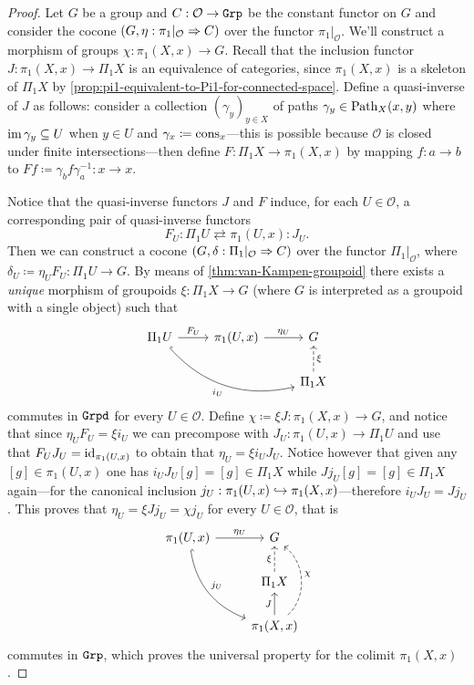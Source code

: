 \begin{proof}
    Let \(G\) be a group and \(C: \mathcal{O} \to {\texttt{Grp}}\) be the constant functor on
    \(G\) and consider the cocone \((G, \eta: \pi_1|_{\mathcal{O}} \Rightarrow C)\) over
    the functor \(\pi_1|_{\mathcal{O}}\). We'll construct a morphism of groups
    \(\chi: \pi_1(X, x) \to G\). Recall that the inclusion functor
    \(J: \pi_1(X, x) \to \Pi_1 X\) is an equivalence of categories, since
    \(\pi_1(X, x)\) is a skeleton of \(\Pi_1 X\) by
    \cref{prop:pi1-equivalent-to-Pi1-for-connected-space}. Define a quasi-inverse of
    \(J\) as follows: consider a collection \((\gamma_y)_{y \in X}\) of paths
    \(\gamma_y \in \operatorname{Path}_X(x, y)\) where \(\operatorname{im} \gamma_y \subseteq U\) when
    \(y \in U\) and \(\gamma_x \coloneq \operatorname{cons}_x\)---this is possible because
    \(\mathcal{O}\) is closed under finite intersections---then define
    \(F: \Pi_1 X \to \pi_1(X, x)\) by mapping \(f: a \to b\) to
    \(F f \coloneq \gamma_b f \gamma_a^{-1}: x \to x\).

    Notice that the quasi-inverse functors \(J\) and \(F\) induce, for each \(U \in
    \mathcal{O}\), a corresponding pair of quasi-inverse functors
    \[
        F_U \colon \Pi_1 U \rightleftarrows \pi_1(U, x) \colon J_U.
    \]
    Then we can construct a cocone \((G, \delta: \Pi_1|_{\mathcal{O}} \Rightarrow C)\) over
    the functor \(\Pi_1|_{\mathcal{O}}\), where
    \(\delta_U \coloneq \eta_U F_U: \Pi_1 U \to G\). By means of
    \cref{thm:van-Kampen-groupoid} there exists a \emph{unique} morphism of
    groupoids \(\xi: \Pi_1 X \to G\) (where \(G\) is interpreted as a groupoid with a
    single object) such that
    \[
        \begin{tikzcd}
            \Pi_1 U \ar[r, "F_U"] \ar[rrd, bend right, hook, "i_U"']
            &\pi_1(U, x) \ar[r, "\eta_U"] &G \\
            &&\Pi_1 X \ar[u, dashed, "\xi"']
        \end{tikzcd}
    \]
    commutes in \({\texttt{Grpd}}\) for every \(U \in \mathcal{O}\). Define
    \(\chi \coloneq \xi J: \pi_1(X, x) \to G\), and notice that since
    \(\eta_U F_U = \xi i_U\) we can precompose with \(J_U: \pi_1(U, x) \to \Pi_1 U\)
    and use that \(F_U J_U = \operatorname{id}_{\pi_1(U, x)}\) to obtain that
    \(\eta_U = \xi i_U J_U\). Notice however that given any \([g] \in \pi_1(U, x)\)
    one has \(i_U J_U [g] = [g] \in \Pi_1 X\) while \(J j_U [g] = [g] \in \Pi_1 X\)
    again---for the canonical inclusion
    \(j_U: \pi_1(U, x) \hookrightarrow \pi_1(X, x)\)---therefore \(i_U J_U = J j_U\). This
    proves that \(\eta_U = \xi J j_U = \chi j_U\) for every \(U \in \mathcal{O}\),
    that is
    \[
        \begin{tikzcd}
            \pi_1(U, x) \ar[r, "\eta_U"] \ar[rdd, bend right, "j_U", hook] &G \\
            &\Pi_1 X \ar[u, dashed, "\xi"] \\
            &\pi_1(X, x) \ar[u, "J"] \ar[uu, dashed, bend right=50, "\chi"']
        \end{tikzcd}
    \]
    commutes in \({\texttt{Grp}}\), which proves the universal property for the colimit
    \(\pi_1(X, x)\).
\end{proof}

